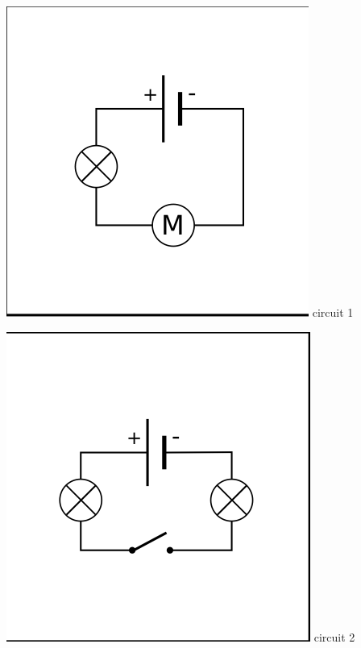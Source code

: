 \documentclass[10pt]{article}
\begin{document}
\begin{center}	
	\begin{minipage}[c]{0.2\textwidth}
		\centering \includegraphics[width=0.8\columnwidth]{circuit1.png} circuit 1
	\end{minipage}
	\hspace{ 0pt}
	\begin{minipage}[c]{0.2\textwidth}
		\centering \includegraphics[width=0.8\columnwidth]{circuit2.png} circuit 2
	\end{minipage}
	\hspace{ 0pt}
	\begin{minipage}[c]{0.2\textwidth}

\end{minipage}
\end{center}
\end{document}
